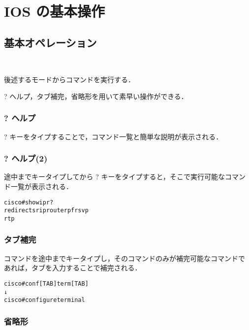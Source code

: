 \section{IOS の基本操作}

\subsection*{基本オペレーション}

　

後述するモードからコマンドを実行する．

? ヘルプ，タブ補完，省略形を用いて素早い操作ができる．

\subsubsection*{? ヘルプ}
? キーをタイプすることで，コマンド一覧と簡単な説明が表示される．

\subsubsection*{? ヘルプ(2)}
途中までキータイプしてから ? キーをタイプすると，そこで実行可能なコマン
ド一覧が表示される．

\begin{center}
\begin{screen}
\begin{alltt}
cisco#show ip r?
redirects  rip  route  rpf  rsvp
rtp
\end{alltt}
\end{screen}
\end{center}

\subsubsection*{タブ補完}

コマンドを途中までキータイプし，そのコマンドのみが補完可能なコマンドで
あれば，タブを入力することで補完される．

\begin{center}
\begin{screen}
\begin{alltt}
cisco#conf[TAB] term[TAB]
       ↓
cisco#configure terminal
\end{alltt}
\end{screen}
\end{center}

\subsubsection*{省略形}


